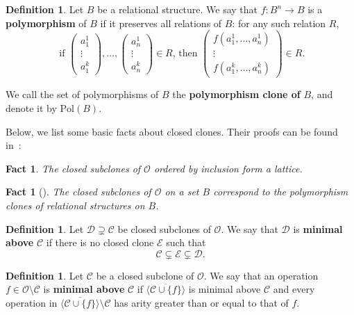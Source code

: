 \documentclass{article}
\newtheorem{fact}[theorem]{Fact}
\theoremstyle{remark}
\theoremstyle{definition}
\newtheorem{definition}[theorem]{Definition}
\begin{document}
\begin{definition}\label{def:pol}
Let $B$ be a relational structure. 
 We say that $f:B^n\to B$ is a \textbf{polymorphism} of $B$ if it preserves all relations of $B$: for any 
 such relation $R$,
\[\text{ if } \begin{pmatrix}
    a^1_1\\
    \vdots\\
    a_1^k
\end{pmatrix}, \dots, 
\begin{pmatrix}
    a_n^1\\
    \vdots\\
    a_n^k
\end{pmatrix}
\in R \text{, then }
\begin{pmatrix}
    f(a_1^1, \dots, a_n^1)\\
    \vdots\\
    f(a_1^k, \dots, a_n^k)
\end{pmatrix}\in R.\]
    
    We call the set of polymorphisms of $B$ the \textbf{polymorphism clone of} $B$, and denote it by $\mathrm{Pol}(B)$. 
\end{definition}

Below, we list some basic facts about closed clones. Their proofs can be found in~\cite{szendrei1986clones}:

\begin{fact} The closed subclones of $\mathcal{O}$ ordered by inclusion form a lattice. 
\end{fact}

\begin{fact}[{\cite{rosenberg1999locally}}] \label{fact:correspondence} The closed subclones of $\mathcal{O}$ on a set $B$  correspond to the polymorphism clones of relational structures on $B$.
\end{fact}

\begin{definition}\label{def:minimalc} Let $\mathcal{D}\supsetneq \mathcal{C}$ be closed subclones of $\mathcal{O}$. We say that $\mathcal{D}$ is \textbf{minimal above} $\mathcal{C}$ if there is no closed clone $\mathcal{E}$ such that 
\[\mathcal{C}\subsetneq \mathcal{E}\subsetneq \mathcal{D}.\]
\end{definition}


\begin{definition}\label{def:minimalop} Let $\mathcal{C}$ be a closed subclone of $\mathcal{O}$. We say that an operation $f\in\mathcal{O}\setminus\mathcal{C}$ is \textbf{minimal above } $\mathcal{C}$ if $\overline{\langle \mathcal C\cup\{f\}\rangle}$ is minimal above $\mathcal{C}$ and every operation in $\overline{\langle \mathcal C\cup\{f\}\rangle}\setminus \mathcal{C}$ has arity greater than or equal to that of $f$.
\end{definition}
\end{document}

